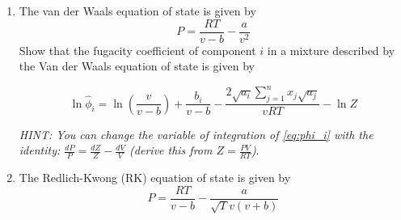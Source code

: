 \documentclass[12pt, A4paper]{article}
\begin{document}
\begin{enumerate}
\item 
The van der Waals equation of state is given by
\begin{equation}
P = \frac{RT}{v - b} - \frac{a}{v^2}
\end{equation}
 Show that the fugacity coefficient of component $i$ in a mixture described by the Van der Waals equation of state is given by
  
\begin{equation}
\ln{\hat{\phi}_i} = \ln{\left(\frac{v}{v - b} \right)}+ \frac{b_i}{v - b} - \frac{2 \sqrt{a_i} \sum_{j = 1}^n x_j \sqrt{a_j} }{v R T} - \ln{Z}
\end{equation}
 
  \textit{HINT: You can change the variable of integration of \autoref{eq:phi_i} with the identity:  $\frac{dP}{P} = \frac{dZ}{Z} - \frac{dV}{V}$  (derive this from $Z = \frac{PV}{RT}$)}.
  
  
   
   
\begin{flushright} 
\end{flushright}

 

\item
 The Redlich-Kwong (RK) equation of state is given by
\begin{equation}  \label{eq:RK}
 P = \frac{RT}{v - b} - \frac{a}{\sqrt{T} v \left(v + b \right)}
\end{equation}


\end{enumerate}
\end{document}
